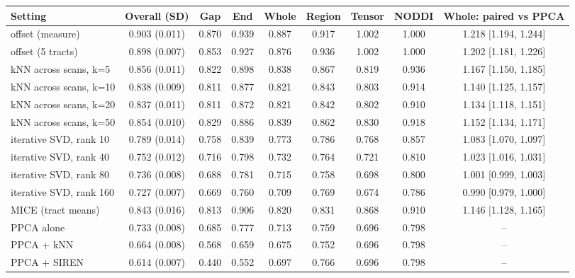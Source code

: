 \begin{tabular}{lcccccccc}
\toprule
Setting & Overall (SD) & Gap & End & Whole & Region & Tensor & NODDI & Whole: paired vs PPCA \\
\midrule
offset (measure) & 0.903 (0.011) & 0.870 & 0.939 & 0.887 & 0.917 & 1.002 & 1.000 & 1.218 [1.194, 1.244] \\
offset (5 tracts) & 0.898 (0.007) & 0.853 & 0.927 & 0.876 & 0.936 & 1.002 & 1.000 & 1.202 [1.181, 1.226] \\
kNN across scans, k=5 & 0.856 (0.011) & 0.822 & 0.898 & 0.838 & 0.867 & 0.819 & 0.936 & 1.167 [1.150, 1.185] \\
kNN across scans, k=10 & 0.838 (0.009) & 0.811 & 0.877 & 0.821 & 0.843 & 0.803 & 0.914 & 1.140 [1.125, 1.157] \\
kNN across scans, k=20 & 0.837 (0.011) & 0.811 & 0.872 & 0.821 & 0.842 & 0.802 & 0.910 & 1.134 [1.118, 1.151] \\
kNN across scans, k=50 & 0.854 (0.010) & 0.829 & 0.886 & 0.839 & 0.862 & 0.830 & 0.918 & 1.152 [1.134, 1.171] \\
iterative SVD, rank 10 & 0.789 (0.014) & 0.758 & 0.839 & 0.773 & 0.786 & 0.768 & 0.857 & 1.083 [1.070, 1.097] \\
iterative SVD, rank 40 & 0.752 (0.012) & 0.716 & 0.798 & 0.732 & 0.764 & 0.721 & 0.810 & 1.023 [1.016, 1.031] \\
iterative SVD, rank 80 & 0.736 (0.008) & 0.688 & 0.781 & 0.715 & 0.758 & 0.698 & 0.800 & 1.001 [0.999, 1.003] \\
iterative SVD, rank 160 & 0.727 (0.007) & 0.669 & 0.760 & 0.709 & 0.769 & 0.674 & 0.786 & 0.990 [0.979, 1.000] \\
MICE (tract means) & 0.843 (0.016) & 0.813 & 0.906 & 0.820 & 0.831 & 0.868 & 0.910 & 1.146 [1.128, 1.165] \\
\midrule
PPCA alone & 0.733 (0.008) & 0.685 & 0.777 & 0.713 & 0.759 & 0.696 & 0.798 & -- \\
PPCA + kNN & 0.664 (0.008) & 0.568 & 0.659 & 0.675 & 0.752 & 0.696 & 0.798 & -- \\
PPCA + SIREN & 0.614 (0.007) & 0.440 & 0.552 & 0.697 & 0.766 & 0.696 & 0.798 & -- \\
\bottomrule
\end{tabular}
